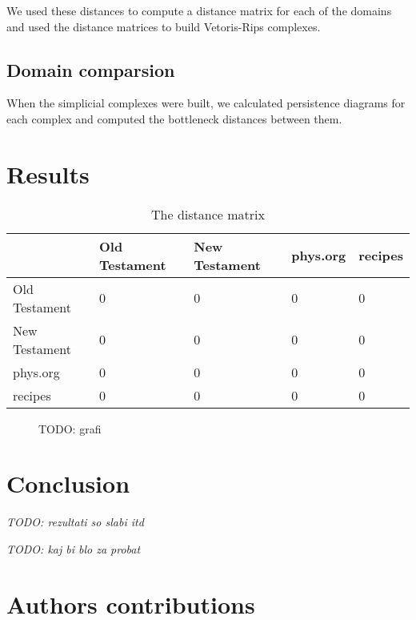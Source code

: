 \documentclass[12pt,a4paper]{amsart}
\begin{document}
We used these distances to compute a distance matrix for each of the
domains and used the distance matrices to build Vetoris-Rips complexes.

\subsection{Domain comparsion}

When the simplicial complexes were built, we calculated persistence diagrams for
each complex and computed the bottleneck distances between them.

\section{Results}

\begin{table}
  \centering
  \begin{tabular}{l|llll}
                  & Old Testament & New Testament & phys.org & recipes \\ \hline
    Old Testament & 0 & 0 & 0 & 0 \\
    New Testament & 0 & 0 & 0 & 0 \\
    phys.org      & 0 & 0 & 0 & 0 \\
    recipes       & 0 & 0 & 0 & 0 \\
  \end{tabular}
  \caption{The distance matrix}
  \label{tab:}
\end{table}

\begin{figure}
  \centering
  \caption{TODO: grafi}
  \label{fig:barcode:alpha}
\end{figure}

\section{Conclusion}

\emph{TODO: rezultati so slabi itd}

\emph{TODO: kaj bi blo za probat}

\section{Authors contributions}



\end{document}
